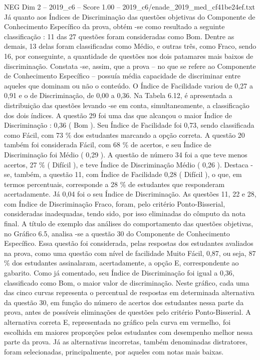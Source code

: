 \begin{textsample}{NEG Dim 2 – 2019\_c6 – Score 1.00 – 2019\_c6/enade\_2019\_med\_cf41be24ef.txt}
Já quanto aos Índices de Discriminação das questões objetivas do Componente de Conhecimento Específico da prova, obtém -se como resultado a seguinte classificação : 11 das 27 questões foram consideradas como Bom.
Dentre as demais, 13 delas foram classificadas como Médio, e outras três, como Fraco, sendo 16, por conseguinte, a quantidade de questões nos dois patamares mais baixos de discriminação.
Constata -se, assim, que a prova – no que se refere ao Componente de Conhecimento Específico – possuía média capacidade de discriminar entre aqueles que dominam ou não o conteúdo.
O Índice de Facilidade variou de 0,27 a 0,91 e o de Discriminação, de 0,00 a 0,36.
Na Tabela 6.12, é apresentada a distribuição das questões levando -se em conta, simultaneamente, a classificação dos dois índices.
A questão 29 foi uma das que alcançou o maior Índice de Discriminação : 0,36 ( Bom ).
Seu Índice de Facilidade foi 0,73, sendo classificada como Fácil, com 73 \% dos estudantes marcando a opção correta.
A questão 20 também foi considerada Fácil, com 68 \% de acertos, e seu Índice de Discriminação foi Médio ( 0,29 ).
A questão de número 34 foi a que teve menos acertos, 27 \% ( Difícil ), e teve Índice de Discriminação Médio ( 0,26 ).
Destaca -se, também, a questão 11, com Índice de Facilidade 0,28 ( Difícil ), o que, em termos percentuais, corresponde a 28 \% de estudantes que responderam acertadamente.
Já 0,04 foi o seu Índice de Discriminação.
As questões 11, 22 e 28, com Índice de Discriminação Fraco, foram, pelo critério Ponto-Bisserial, consideradas inadequadas, tendo sido, por isso eliminadas do cômputo da nota final.
A título de exemplo das análises do comportamento das questões objetivas, no Gráfico 6.5, analisa -se a questão 30 do Componente de Conhecimento Específico.
Essa questão foi considerada, pelas respostas dos estudantes avaliados na prova, como uma questão com nível de facilidade Muito Fácil, 0,87, ou seja, 87 \% dos estudantes assinalaram, acertadamente, a opção E, correspondente ao gabarito.
Como já comentado, seu Índice de Discriminação foi igual a 0,36, classificado como Bom, o maior valor de discriminação.
Neste gráfico, cada uma das cinco curvas representa o percentual de respostas em determinada alternativa da questão 30, em função do número de acertos dos estudantes nessa parte da prova, antes de possíveis eliminações de questões pelo critério Ponto-Bisserial.
A alternativa correta E, representada no gráfico pela curva em vermelho, foi escolhida em maiores proporções pelos estudantes com desempenho melhor nessa parte da prova.
Já as alternativas incorretas, também denominadas distratores, foram selecionadas, principalmente, por aqueles com notas mais baixas.

\end{textsample}
